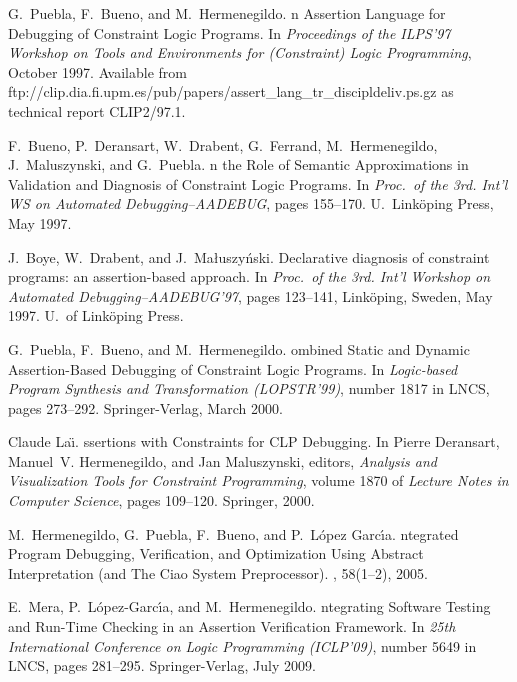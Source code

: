 \documentclass{llncs}
\begin{document}
\begin{thebibliography}{10}
G.~Puebla, F.~Bueno, and M.~Hermenegildo.
n {A}ssertion {L}anguage for {D}ebugging of {C}onstraint {L}ogic
  {P}rograms.
\newblock In {\em Proceedings of the ILPS'97 Workshop on Tools and Environments
  for (Constraint) Logic Programming}, October 1997.
\newblock Available from 
  {ftp://clip.dia.fi.upm.es/pub/papers/assert\_lang\_tr\_discipldeliv.ps.gz} as
  technical report {CLIP}2/97.1.

F.~Bueno, P.~Deransart, W.~Drabent, G.~Ferrand, M.~Hermenegildo,
  J.~Maluszynski, and G.~Puebla.
n the {R}ole of {S}emantic {A}pproximations in {V}alidation and
  {D}iagnosis of {C}onstraint {L}ogic {P}rograms.
\newblock In {\em Proc.\ of the 3rd. Int'l WS on Automated Debugging--AADEBUG},
  pages 155--170. U.\ Link\"oping Press, May 1997.

J.~Boye, W.~Drabent, and J.~Ma{\l}uszy\'{n}ski.
\newblock Declarative diagnosis of constraint programs: an assertion-based
  approach.
\newblock In {\em Proc.\ of the 3rd. Int'l Workshop on Automated
  Debugging--AADEBUG'97}, pages 123--141, Link{\"o}ping, Sweden, May 1997. U.\
  of Link{\"o}ping Press.

G.~Puebla, F.~Bueno, and M.~Hermenegildo.
ombined {S}tatic and {D}ynamic {A}ssertion-{B}ased {D}ebugging of
  {C}onstraint {L}ogic {P}rograms.
\newblock In {\em Logic-based Program Synthesis and Transformation
  (LOPSTR'99)}, number 1817 in LNCS, pages 273--292. Springer-Verlag, March
  2000.

Claude La\"{\i}.
ssertions with {C}onstraints for {CLP} {D}ebugging.
\newblock In Pierre Deransart, Manuel~V. Hermenegildo, and Jan Maluszynski,
  editors, {\em {A}nalysis and {V}isualization {T}ools for {C}onstraint
  {P}rogramming}, volume 1870 of {\em Lecture Notes in Computer Science}, pages
  109--120. Springer, 2000.

M.~Hermenegildo, G.~Puebla, F.~Bueno, and P.~L\'{o}pez Garc\'{\i}a.
\newblock {I}ntegrated {P}rogram {D}ebugging, {V}erification, and
  {O}ptimization {U}sing {A}bstract {I}nterpretation (and {T}he {C}iao {S}ystem
  {P}reprocessor).
, 58(1--2), 2005.

E.~Mera, P.~L\'{o}pez-Garc\'{\i}a, and M.~Hermenegildo.
ntegrating {S}oftware {T}esting and {R}un-{T}ime {C}hecking in an
  {A}ssertion {V}erification {F}ramework.
\newblock In {\em 25th International Conference on Logic Programming
  (ICLP'09)}, number 5649 in LNCS, pages 281--295. Springer-Verlag, July 2009.


\end{thebibliography}
\end{document}
